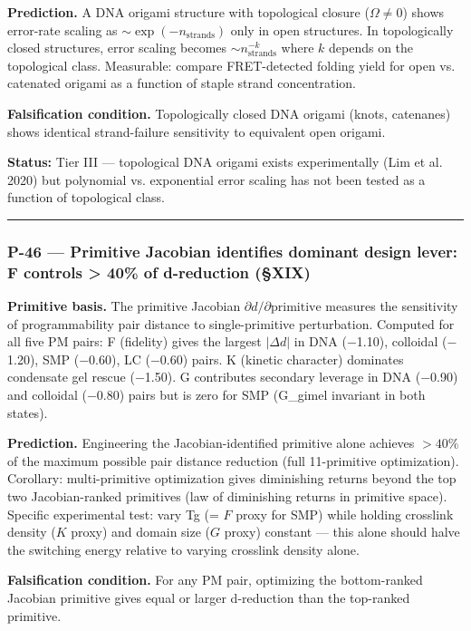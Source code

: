 \documentclass[12pt,a4paper]{article}
\begin{document}
\textbf{Prediction.} A DNA origami structure with topological closure ($\Omega \neq 0$) shows error-rate scaling as $\sim \exp(-n_\text{strands})$ only in open structures. In topologically closed structures, error scaling becomes $\sim n_\text{strands}^{-k}$ where $k$ depends on the topological class. Measurable: compare FRET-detected folding yield for open vs. catenated origami as a function of staple strand concentration.

\textbf{Falsification condition.} Topologically closed DNA origami (knots, catenanes) shows identical strand-failure sensitivity to equivalent open origami.

\textbf{Status:} Tier III --- topological DNA origami exists experimentally (Lim et al. 2020) but polynomial vs. exponential error scaling has not been tested as a function of topological class.

\begin{center}
\rule{0.5\textwidth}{0.4pt}
\end{center}

\subsubsection{P-46 --- Primitive Jacobian identifies dominant design lever: F controls \textgreater{} 40\% of d-reduction (§XIX)}

\textbf{Primitive basis.} The primitive Jacobian $\partial d / \partial \text{primitive}$ measures the sensitivity of programmability pair distance to single-primitive perturbation. Computed for all five PM pairs: F (fidelity) gives the largest $|\Delta d|$ in DNA ($-$1.10), colloidal ($-$1.20), SMP ($-$0.60), LC ($-$0.60) pairs. K (kinetic character) dominates condensate gel rescue ($-$1.50). G contributes secondary leverage in DNA ($-$0.90) and colloidal ($-$0.80) pairs but is zero for SMP (G\_gimel invariant in both states).

\textbf{Prediction.} Engineering the Jacobian-identified primitive alone achieves $> 40\%$ of the maximum possible pair distance reduction (full 11-primitive optimization). Corollary: multi-primitive optimization gives diminishing returns beyond the top two Jacobian-ranked primitives (law of diminishing returns in primitive space). Specific experimental test: vary Tg (= $F$ proxy for SMP) while holding crosslink density ($K$ proxy) and domain size ($G$ proxy) constant --- this alone should halve the switching energy relative to varying crosslink density alone.

\textbf{Falsification condition.} For any PM pair, optimizing the bottom-ranked Jacobian primitive gives equal or larger d-reduction than the top-ranked primitive.
\end{document}
